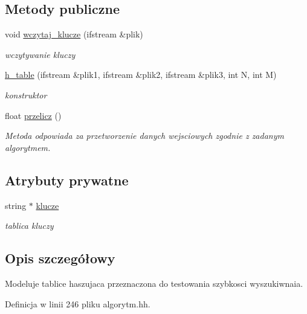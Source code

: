 \subsection*{\-Metody publiczne}
\begin{DoxyCompactItemize}
\item 
void \hyperlink{classh__table_a938885a9ce57ae0c447dd9a146637ce9}{wczytaj\-\_\-klucze} (ifstream \&plik)
\begin{DoxyCompactList}\small\item\em wczytywanie kluczy \end{DoxyCompactList}\item 
\hyperlink{classh__table_add097e1c13f110997c50b57f7d5e4cf5}{h\-\_\-table} (ifstream \&plik1, ifstream \&plik2, ifstream \&plik3, int \-N, int \-M)
\begin{DoxyCompactList}\small\item\em konstruktor \end{DoxyCompactList}\item 
float \hyperlink{classh__table_a8726955778aed30773dccf8e0cb81064}{przelicz} ()
\begin{DoxyCompactList}\small\item\em \-Metoda odpowiada za przetworzenie danych wejsciowych zgodnie z zadanym algorytmem. \end{DoxyCompactList}\end{DoxyCompactItemize}
\subsection*{\-Atrybuty prywatne}
\begin{DoxyCompactItemize}
\item 
string $\ast$ \hyperlink{classh__table_af7ef9b7c0043f4320e5b8fd9ce3678d5}{klucze}
\begin{DoxyCompactList}\small\item\em tablica kluczy \end{DoxyCompactList}\end{DoxyCompactItemize}


\subsection{\-Opis szczegółowy}
\-Modeluje tablice haszujaca przeznaczona do testowania szybkosci wyszukiwnaia. 

\-Definicja w linii 246 pliku algorytm.\-hh.



